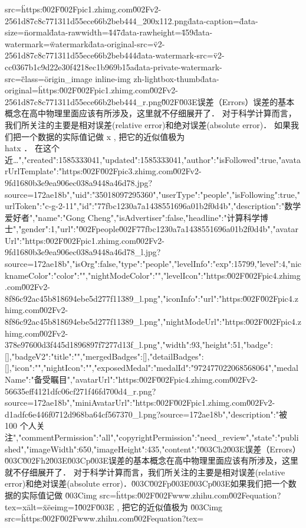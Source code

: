 src=\"https:\u002F\u002Fpic1.zhimg.com\u002Fv2-2561d87c8c771311d55ece66b2beb444_200x112.png\" data-caption=\"\" data-size=\"normal\" data-rawwidth=\"447\" data-rawheight=\"459\" data-watermark=\"watermark\" data-original-src=\"v2-2561d87c8c771311d55ece66b2beb444\" data-watermark-src=\"v2-cc0367b1c9d22e30f4218ec1b969b15a\" data-private-watermark-src=\"\" class=\"origin_image inline-img zh-lightbox-thumb\" data-original=\"https:\u002F\u002Fpic1.zhimg.com\u002Fv2-2561d87c8c771311d55ece66b2beb444_r.png\"\u002F\u003E误差（Errors）误差的基本概念在高中物理里面应该有所涉及，这里就不仔细展开了． 对于科学计算而言，我们所关注的主要是相对误差(relative error)和绝对误差(absolute error)． 如果我们把一个数据的实际值记做 x , 把它的近似值极为 \\hat{x} ． 在这个近…","created":1585333041,"updated":1585333041,"author":{"isFollowed":true,"avatarUrlTemplate":"https:\u002F\u002Fpic3.zhimg.com\u002Fv2-9fd1680b3e9ea906ec038a9448a46d78.jpg?source=172ae18b","uid":"35018097295360","userType":"people","isFollowing":true,"urlToken":"c-g-2-11","id":"77fbc1230a7a1438551696a01b2f0d4b","description":"数学爱好者","name":"Gong Cheng","isAdvertiser":false,"headline":"计算科学博士","gender":1,"url":"\u002Fpeople\u002F77fbc1230a7a1438551696a01b2f0d4b","avatarUrl":"https:\u002F\u002Fpic1.zhimg.com\u002Fv2-9fd1680b3e9ea906ec038a9448a46d78_l.jpg?source=172ae18b","isOrg":false,"type":"people","levelInfo":{"exp":15799,"level":4,"nicknameColor":{"color":"","nightModeColor":""},"levelIcon":"https:\u002F\u002Fpic4.zhimg.com\u002Fv2-8f86c92ac45b818694ebe5d277f11389_l.png","iconInfo":{"url":"https:\u002F\u002Fpic4.zhimg.com\u002Fv2-8f86c92ac45b818694ebe5d277f11389_l.png","nightModeUrl":"https:\u002F\u002Fpic4.zhimg.com\u002Fv2-378e97600d3f445d1896897f7277d13f_l.png","width":93,"height":51}},"badge":[],"badgeV2":{"title":"","mergedBadges":[],"detailBadges":[],"icon":"","nightIcon":""},"exposedMedal":{"medalId":"972477022068568064","medalName":"备受瞩目","avatarUrl":"https:\u002F\u002Fpic4.zhimg.com\u002Fv2-56635eff4121dfc06cf271f46fd700d4_r.png?source=172ae18b","miniAvatarUrl":"https:\u002F\u002Fpic1.zhimg.com\u002Fv2-d1adfc6e446f0712d968ba64cf567370_l.png?source=172ae18b","description":"被 100 个人关注"}},"commentPermission":"all","copyrightPermission":"need_review","state":"published","imageWidth":650,"imageHeight":435,"content":"\u003Ch2\u003E误差（Errors）\u003C\u002Fh2\u003E\u003Cp\u003E误差的基本概念在高中物理里面应该有所涉及，这里就不仔细展开了． 对于科学计算而言，我们所关注的主要是相对误差(relative error)和绝对误差(absolute error)．\u003C\u002Fp\u003E\u003Cp\u003E如果我们把一个数据的实际值记做 \u003Cimg src=\"https:\u002F\u002Fwww.zhihu.com\u002Fequation?tex=x\" alt=\"x\" eeimg=\"1\"\u002F\u003E , 把它的近似值极为 \u003Cimg src=\"https:\u002F\u002Fwww.zhihu.com\u002Fequation?tex=%